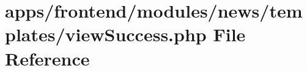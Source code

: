 \hypertarget{frontend_2modules_2news_2templates_2view_success_8php}{\section{apps/frontend/modules/news/templates/view\-Success.php File Reference}
\label{frontend_2modules_2news_2templates_2view_success_8php}
}
